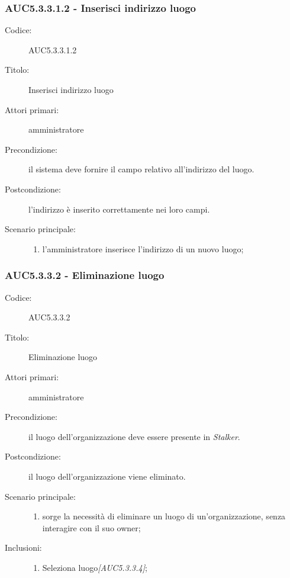 \documentclass[../analisi-dei-requisiti.tex]{subfiles}
\begin{document}
\subsubsection{AUC5.3.3.1.2 - Inserisci indirizzo luogo}%
\label{subsub:AUC5.3.3.1.2}
\begin{description}
  \item[Codice:] AUC5.3.3.1.2
  \item[Titolo:] Inserisci indirizzo luogo
  \item[Attori primari:] amministratore
  \item[Precondizione:] il sistema deve fornire il campo relativo all'indirizzo del luogo.
  \item[Postcondizione:] l'indirizzo è inserito correttamente nei loro campi.
  \item[Scenario principale:]
  \begin{enumerate}
    \item l'amministratore inserisce l'indirizzo di un nuovo luogo;
  \end{enumerate}
\end{description}

\subsubsection{AUC5.3.3.2 - Eliminazione luogo}%
\label{subsub:AUC5.3.3.2}
\begin{description}
  \item[Codice:] AUC5.3.3.2
  \item[Titolo:] Eliminazione luogo
  \item[Attori primari:] amministratore
  \item[Precondizione:] il luogo dell'organizzazione deve essere presente in \emph{Stalker}.
  \item[Postcondizione:] il luogo dell'organizzazione viene eliminato.
  \item[Scenario principale:]
  \begin{enumerate}
    \item sorge la necessità di eliminare un luogo di un'organizzazione, senza interagire con il suo owner;
  \end{enumerate}
  \item[Inclusioni:]
  \begin{enumerate}
    \item Seleziona luogo\emph{[AUC5.3.3.4]};
  \end{enumerate}
\end{description}
\end{document}
